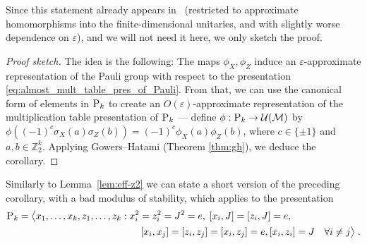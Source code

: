 \documentclass[11pt]{article}
\theoremstyle{definition}
\newcommand{\Id}{\ensuremath{I}}
\newcommand{\Z}{\ensuremath{\mathbb{Z}}}
\newcommand{\mM}{\ensuremath{\mathcal{M}}}
\newcommand{\mU}{\ensuremath{\mathcal{U}}}
\newcommand{\eps}{\varepsilon}
\newcommand{\gamestyle}[1]{\ensuremath{\textsc{#1}}\xspace}
\newcommand{\pauli}{\gamestyle{P}}
\begin{document}
Since this statement already appears in~\cite{natarajan2017quantum} (restricted to approximate homomorphisms into the finite-dimensional unitaries, and with slightly worse dependence on $\eps$), and we will not need it here, we only sketch the proof. 

\begin{proof}[Proof sketch]
The idea is the following: The maps $\phi_X,\phi_Z$ induce an $\eps$-approximate representation of the Pauli group with respect to the presentation \eqref{eq:almost_mult_table_pres_of_Pauli}. From that, we can use the canonical form of elements in $\pauli_k$ to create an $O(\eps)$-approximate representation of the multiplication table presentation of $\pauli_k$ --- define $\phi:\pauli_k \to \mU(\mM)$ by $\phi((-1)^c \sigma_X(a)\sigma_Z(b))= (-1)^c \phi_X(a)\phi_Z(b)$, where $c\in \{\pm 1\}$ and $a,b\in \Z_2^k$. Applying Gowers--Hatami (Theorem \ref{thm:gh}), we deduce the corollary.
\end{proof}

Similarly to Lemma~\ref{lem:eff-z2} we can state a short version of the preceding corollary, with a bad modulus of stability, which applies to the presentation
\begin{align}
 \pauli_k = \big\langle x_1,\ldots,x_k,z_1,\ldots,z_k &: x_i^2=z_i^2=J^2=e,\; [x_i,J]=[z_i,J]=e,\notag\\
&\qquad  [x_i,x_j]=[z_i,z_j]=[x_i,z_j]=e, [x_i,z_i]=J \quad \forall i\neq j \big\rangle\;.\label{eq:pauli-efficient}
\end{align}
\end{document}
